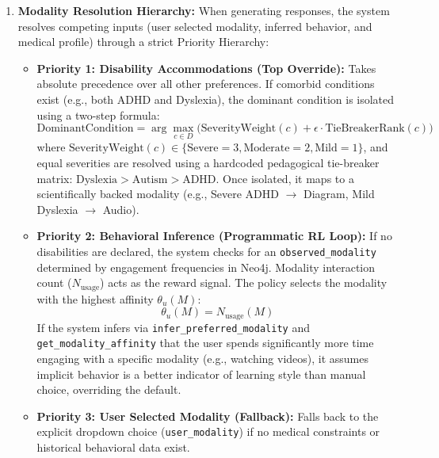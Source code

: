 \begin{enumerate}
    \item \textbf{Modality Resolution Hierarchy:} When generating responses, the system resolves competing inputs (user selected modality, inferred behavior, and medical profile) through a strict Priority Hierarchy:
    \begin{itemize}
        \item \textbf{Priority 1: Disability Accommodations (Top Override):} Takes absolute precedence over all other preferences. If comorbid conditions exist (e.g., both ADHD and Dyslexia), the dominant condition is isolated using a two-step formula:
        \begin{equation}
            \text{DominantCondition} = \arg\max_{c \in D} \Big( \text{SeverityWeight}(c) + \epsilon \cdot \text{TieBreakerRank}(c) \Big)
        \end{equation}
        where $\text{SeverityWeight}(c) \in \{\text{Severe}=3, \text{Moderate}=2, \text{Mild}=1\}$, and equal severities are resolved using a hardcoded pedagogical tie-breaker matrix: $\text{Dyslexia} > \text{Autism} > \text{ADHD}$. Once isolated, it maps to a scientifically backed modality (e.g., Severe ADHD $\rightarrow$ Diagram, Mild Dyslexia $\rightarrow$ Audio).
        
        \item \textbf{Priority 2: Behavioral Inference (Programmatic RL Loop):} If no disabilities are declared, the system checks for an \texttt{observed\_modality} determined by engagement frequencies in Neo4j. Modality interaction count ($N_{\text{usage}}$) acts as the reward signal. The policy selects the modality with the highest affinity $\theta_u(M)$:
        \begin{equation}
            \theta_u(M) = N_{\text{usage}}(M)
        \end{equation}
        If the system infers via \texttt{infer\_preferred\_modality} and \texttt{get\_modality\_affinity} that the user spends significantly more time engaging with a specific modality (e.g., watching videos), it assumes implicit behavior is a better indicator of learning style than manual choice, overriding the default.
        
        \item \textbf{Priority 3: User Selected Modality (Fallback):} Falls back to the explicit dropdown choice (\texttt{user\_modality}) if no medical constraints or historical behavioral data exist.
    \end{itemize}


\end{enumerate}
